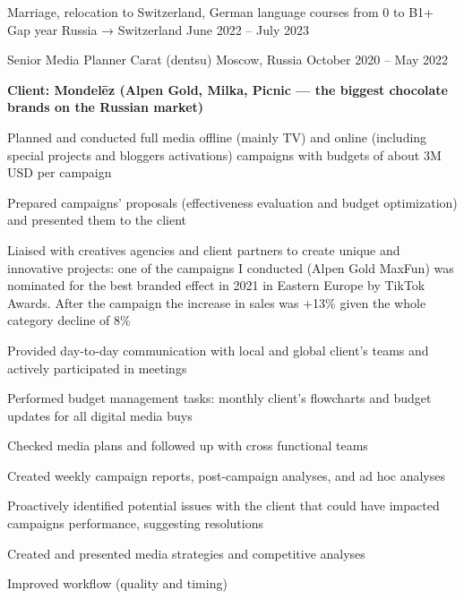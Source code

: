 \documentclass[11pt, a4paper]{awesome-cv}
\begin{document}
\begin{cventries}
\cventry
	{Marriage, relocation to Switzerland, German language courses from 0 to B1+}
	{Gap year}
	{Russia → Switzerland}
	{June 2022 -- July 2023}
	{}
\vspace{-4mm}

\cventry
	{Senior Media Planner}
	{Carat (dentsu)}
	{Moscow, Russia}
	{October 2020 -- May 2022}
	{
		\begin{cvitems}
			\item[] {\bf Client: Mondelēz (Alpen Gold, Milka, Picnic --- the biggest chocolate brands on the Russian market)}
			\item {Planned and conducted full media offline (mainly TV) and online (including special projects and bloggers activations) campaigns with budgets of about 3M USD per campaign}
			\item {Prepared campaigns’ proposals (effectiveness evaluation and budget optimization) and presented them to the client}
			\item {Liaised with creatives agencies and client partners to create unique and innovative projects: one of the campaigns I conducted (Alpen Gold MaxFun) was nominated for the best branded effect in 2021 in Eastern Europe by TikTok Awards. After the campaign the increase in sales was +13\% given the whole category decline of 8\%}
			\item {Provided day-to-day communication with local and global client’s teams and actively participated in meetings}
			\item {Performed budget management tasks: monthly client’s flowcharts and budget updates for all digital media buys}
			\item {Checked media plans and followed up with cross functional teams}
			\item {Created weekly campaign reports, post-campaign analyses, and ad hoc analyses}
			\item {Proactively identified potential issues with the client that could have impacted campaigns performance, suggesting resolutions}
			\item {Created and presented media strategies and competitive analyses}
			\item {Improved workflow (quality and timing)}
		\end{cvitems}
	}


\end{cventries}
\end{document}
